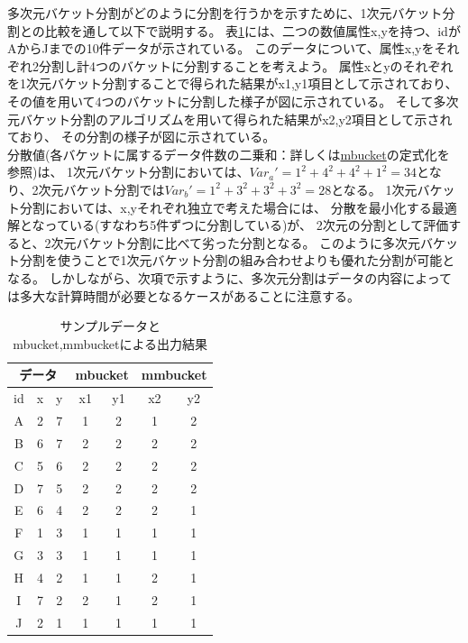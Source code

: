多次元バケット分割がどのように分割を行うかを示すために、1次元バケット分割との比較を通して以下で説明する。
表\ref{tbl:mmbucket_indata}には、二つの数値属性x,yを持つ、idがAからJまでの10件データが示されている。
このデータについて、属性x,yをそれぞれ2分割し計4つのバケットに分割することを考えよう。
属性xとyのそれぞれを1次元バケット分割することで得られた結果がx1,y1項目として示されており、
その値を用いて4つのバケットに分割した様子が図\label{fig:mmbucket_1dim}に示されている。
そして多次元バケット分割のアルゴリズムを用いて得られた結果がx2,y2項目として示されており、
その分割の様子が図\label{fig:mmbucket_2dim}に示されている。\\
分散値(各バケットに属するデータ件数の二乗和：詳しくは\hyperref[sect:mbucket]{mbucket}の定式化を参照)は、
1次元バケット分割においては、$Var_a'=1^2+4^2+4^2+1^2=34$となり、2次元バケット分割では$Var_b'=1^2+3^2+3^2+3^2=28$となる。
1次元バケット分割においては、x,yそれぞれ独立で考えた場合には、
分散を最小化する最適解となっている(すなわち5件ずつに分割している)が、
2次元の分割として評価すると、2次元バケット分割に比べて劣った分割となる。
このように多次元バケット分割を使うことで1次元バケット分割の組み合わせよりも優れた分割が可能となる。
しかしながら、次項で示すように、多次元分割はデータの内容によっては多大な計算時間が必要となるケースがあることに注意する。

\begin{table}[hbt]
\begin{center}
 \caption{サンプルデータとmbucket,mmbucketによる出力結果\label{tbl:mmbucket_indata}}
{\footnotesize
 \begin{tabular}{c|c|c|c|c|c|c}
  \hline
  \multicolumn{3}{c|}{データ} & \multicolumn{2}{|c|}{mbucket} & \multicolumn{2}{|c}{mmbucket} \\
\hline
id & x & y & x1 & y1 & x2 & y2 \\
\hline
A & 2 & 7 & 1 & 2 & 1 & 2 \\
B & 6 & 7 & 2 & 2 & 2 & 2 \\
C & 5 & 6 & 2 & 2 & 2 & 2 \\
D & 7 & 5 & 2 & 2 & 2 & 2 \\
E & 6 & 4 & 2 & 2 & 2 & 1 \\
F & 1 & 3 & 1 & 1 & 1 & 1 \\
G & 3 & 3 & 1 & 1 & 1 & 1 \\
H & 4 & 2 & 1 & 1 & 2 & 1 \\
I & 7 & 2 & 2 & 1 & 2 & 1 \\
J & 2 & 1& 1 & 1 & 1 & 1 \\ 
\hline
 \end{tabular}
}
\end{center}
\end{table}

